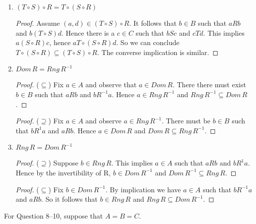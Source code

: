 \documentclass{article}
\begin{document}
\begin{enumerate}
    \item $(T \circ S) \circ R = T \circ (S \circ R)$
      \begin{proof}
        Assume $(a,d)\in (T \circ S) \circ R$. It follows that $b\in B$ such that $aRb$ and $b(T \circ S)d$. Hence there is a $c\in C$ such that $bSc$ and $cTd$. This implies $a(S \circ R)c$, hence $aT\circ (S \circ R)d$. So we can conclude $T \circ (S \circ R) \subseteq (T \circ S) \circ R$. The converse implication is similar.
      \end{proof}
    \item $Dom\,R = Rng\,R^{-1}$
      \begin{proof} ($\subseteq$)
        Fix $a \in A$ and observe that $a \in Dom\,R$. There there must exist $b\in B$ such that $aRb$ and $bR^{-1}a$. Hence $a \in Rng\,R^{-1}$ and $Rng\,R^{-1} \subseteq Dom\,R$.
      \end{proof}
      \begin{proof} ($\supseteq$)
Fix $a \in A$ and observe $a \in Rng\,R^{-1}$. There must be $b\in B$ such that $bR^{1}a$ and $aRb$. Hence $a \in Dom\,R$ and $Dom\,R \subseteq Rng\,R^{-1}$.
      \end{proof}
    \item $Rng\,R = Dom\,R^{-1}$
      \begin{proof} ($\supseteq$)
        Suppose $b\in Rng\,R$. This implies $a \in A$ such that $aRb$ and $bR^{1}a$. Hence by the invertibility of R, $b\in Dom\,R^{-1}$ and $Dom\,R^{-1} \subseteq Rng\,R$.
      \end{proof}
      \begin{proof} ($\subseteq$)
Fix $b\in Dom\,R^{-1}$. By implication we have $a \in A$ such that $bR^{-1}a$ and $aRb$. So it follows that $b \in Rng\,R$ and $Rng\,R \subseteq Dom\,R^{-1}$.
      \end{proof}
  \end{enumerate}
  For Question 8–10, suppose that $A = B = C$.
\end{document}
